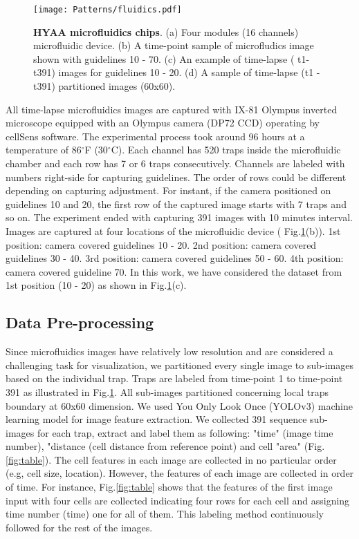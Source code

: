 \documentclass[conference]{IEEEtran}
\begin{document}
\begin{figure}
\centering
\texttt{[image: Patterns/fluidics.pdf]}
\caption{ \textbf{HYAA microfluidics chips}. (a) Four modules (16 channels) microfluidic device. (b) A time-point sample of microfludics image shown with guidelines 10 - 70. (c) An example of time-lapse ( t1-t391) images for guidelines 10 - 20. (d) A sample of time-lapse (t1 - t391) partitioned images (60x60).}
\label{fig:micro}
\end{figure}

All time-lapse microfluidics images are captured with IX-81 Olympus inverted microscope equipped with an Olympus camera (DP72 CCD) operating by cellSens software. The experimental process took around 96 hours at a temperature of 86$^{\circ}$F (30$^{\circ}$C). Each channel has 520 traps inside the microfluidic chamber and each row has 7 or 6 traps consecutively. Channels are labeled with numbers right-side for capturing guidelines. The order of rows could be different depending on capturing adjustment. For instant, if the camera positioned on guidelines 10 and 20, the first row of the captured image starts with 7 traps and so on. The experiment ended with capturing 391 images with 10 minutes interval. Images are captured at four locations of the microfluidic device ( Fig.\ref{fig:micro}(b)). 1st position: camera covered guidelines 10 - 20. 2nd position: camera covered guidelines 30 - 40. 3rd position: camera covered guidelines 50 - 60. 4th position: camera covered guideline 70. In this work, we have considered the dataset from 1st position (10 - 20) as shown in Fig.\ref{fig:micro}(c).

\subsection{Data Pre-processing}
Since microfluidics images have relatively low resolution and are considered a challenging task for visualization, we partitioned every single image to sub-images based on the individual trap. Traps are labeled from time-point 1 to time-point 391 as illustrated in Fig.\ref{fig:micro}. All sub-images partitioned concerning local traps boundary at 60x60 dimension. We used You Only Look Once (YOLOv3) \cite{ref20} machine learning model for image feature extraction. We collected 391 sequence sub-images for each trap, extract and label them as following: "time" (image time number), "distance (cell distance from reference point) and cell "area" (Fig.\ref{fig:table}). The cell features in each image are collected in no particular order (e.g, cell size, location). However, the features of each image are collected in order of time. For instance, Fig.\ref{fig:table} shows that the features of the first image input with four cells are collected indicating four rows for each cell and assigning time number (time) one for all of them. This labeling method continuously followed for the rest of the images.
\end{document}
